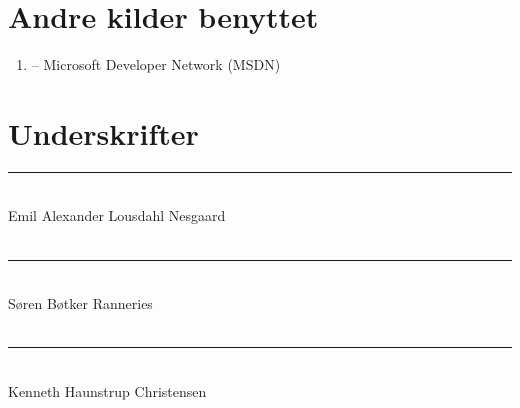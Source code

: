 \documentclass[11pt]{article}
\begin{document}
\section{Andre kilder benyttet}
\begin{enumerate}
	\item[] -- Microsoft Developer Network (MSDN)
\end{enumerate}

\section{Underskrifter}
\vspace{2cm}
\rule{9cm}{1pt}\\
\vspace{1.5cm}
Emil Alexander Lousdahl Nesgaard\\\\
\rule{9cm}{1pt}\\
\vspace{1.5cm}
Søren Bøtker Ranneries\\\\
\rule{9cm}{1pt}\\
\vspace{1.5cm}
Kenneth Haunstrup Christensen\\\\
\end{document}
